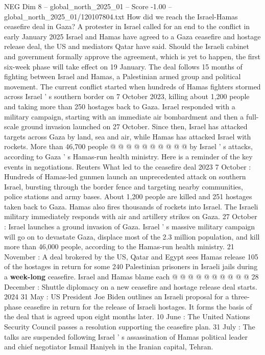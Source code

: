 \begin{textsample}{NEG Dim 8 – global\_north\_2025\_01 – Score -1.00 – global\_north\_2025\_01/120107804.txt}  \label{ex:f8_neg_342}
How did we reach the Israel-Hamas ceasefire deal in Gaza?
A protester in Israel called for an end to the conflict in early January 2025 Israel and Hamas have agreed to a Gaza ceasefire and hostage release deal, the US and mediators Qatar have said.
Should the Israeli cabinet and government formally approve the agreement, which is yet to happen, the first six-week phase will take effect on 19 January.
The deal follows 15 months of fighting between Israel and Hamas, a Palestinian armed group and political movement.
The current conflict started when hundreds of Hamas fighters stormed across Israel ' s southern border on 7 October 2023, killing about 1,200 people and taking more than 250 hostages back to Gaza.
Israel responded with a military campaign, starting with an immediate air bombardment and then a full-scale ground invasion launched on 27 October.
Since then, Israel has attacked targets across Gaza by land, sea and air, while Hamas has attacked Israel with rockets.
More than 46,700 people @ @ @ @ @ @ @ @ @ @ by Israel ' s attacks, according to Gaza ' s Hamas-run health ministry.
Here is a reminder of the key events in negotiations.
Reuters What led to the ceasefire deal 2023 7 October : Hundreds of Hamas-led gunmen launch an unprecedented attack on southern Israel, bursting through the border fence and targeting nearby communities, police stations and army bases.
About 1,200 people are killed and 251 hostages taken back to Gaza.
Hamas also fires thousands of rockets into Israel.
The Israeli military immediately responds with air and artillery strikes on Gaza. 27 October : Israel launches a ground invasion of Gaza.
Israel ' s massive military campaign will go on to devastate Gaza, displace most of the 2.3 million population, and kill more than 46,000 people, according to the Hamas-run health ministry. 21 November : A deal brokered by the US, Qatar and Egypt sees Hamas release 105 of the hostages in return for some 240 Palestinian prisoners in Israeli jails during a \textbf{week-long} ceasefire.
Israel and Hamas blame each @ @ @ @ @ @ @ @ @ @ 28 December : Shuttle diplomacy on a new ceasefire and hostage release deal starts. 2024 31 May : US President Joe Biden outlines an Israeli proposal for a three-phase ceasefire in return for the release of Israeli hostages.
It forms the basis of the deal that is agreed upon eight months later. 10 June : The United Nations Security Council passes a resolution supporting the ceasefire plan. 31 July : The talks are suspended following Israel ' s assassination of Hamas political leader and chief negotiator Ismail Haniyeh in the Iranian capital, Tehran.

\end{textsample}
